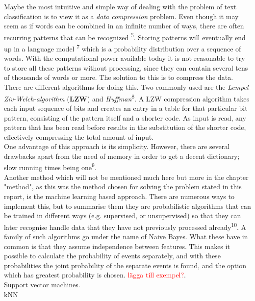 \documentclass[a4paper]{article}
\begin{document}
Maybe the most intuitive and simple way of dealing with the problem of text classification is to view it as a \textit{data compression} problem. Even though it may seem as if words can be combined in an infinite number of ways, there are often recurring patterns that can be recognized \textsuperscript{5}. Storing patterns will eventually end up in a language model \textsuperscript{7} which is a probability distribution over a sequence of words. With the computational power available today it is not reasonable to try to store all these patterns without processing, since they can contain several tens of thousands of words or more. The solution to this is to compress the data. There are different algorithms for doing this. Two commonly used are the \textit{Lempel-Ziv-Welch-algorithm} (\textbf{LZW}) and \textit{Huffman}\textsuperscript{8}. A LZW compression algorithm takes each input sequence of bits and creates an entry in a table for that particular bit pattern, consisting of the pattern itself and a shorter code. As input is read, any pattern that has been read before results in the substitution of the shorter code, effectively compressing the total amount of input.\\One advantage of this approach is its simplicity. However, there are several drawbacks apart from the need of memory in order to get a decent dictionary; slow running times being one\textsuperscript{9}. \\

Another method which will not be mentioned much here but more in the chapter "method", as this was the method chosen for solving the problem stated in this report, is the machine learning based approach. There are numerous ways to implement this, but to summarise them they are probabilistic algorithms that can be trained in different ways (e.g. supervised, or unsupervised) so that they can later recognise handle data that they have not previously processed already\textsuperscript{10}. A family of such algorithms go under the name of Naive Bayes. What these have in common is that they assume independence between features. This makes it possible to calculate the probability of events separately, and with these probabilities the joint probability of the separate events is found, and the option which has greatest probability is chosen. \textcolor{red}{lägga till exempel?}. \\

\noindent Support vector machines.\\

\noindent kNN\\ 
\end{document}
